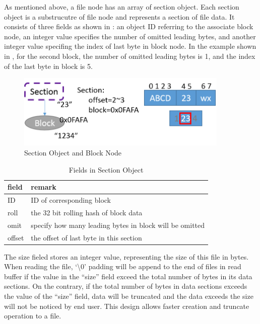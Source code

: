     As mentioned above, a file node has an array of section object. Each section object is a substrucutre of file node and represents a section of file data. It consists of three fields as shown in : an object ID referring to the associate block node, an integer value specifies the number of omitted leading bytes, and another integer value specifing the index of last byte in block node. In the example shown in , for the second block, the number of omitted leading bytes is 1, and the index of the last byte in block is 5.

\begin{figure}[hbtp]
\centering
\includegraphics[width=0.9\textwidth]{Chapter-3/figs/fig9.png}
\caption{Section Object and Block Node}
\label{fig:section_and_block}
\end{figure}

\begin{table}
\caption{Fields in Section Object}
\label{tab:section_fields}
\begin{center}
\begin{tabular}{ll}
\toprule
field & remark\\
\midrule
ID & ID of corresponding block\\
roll & the 32 bit rolling hash of block data\\
omit & specify how many leading bytes in block will be omitted\\
offset & the offset of last byte in this section\\
\bottomrule
\end{tabular}
\end{center}
\end{table}

    The size fieled stores an integer value, representing the size of this file in bytes. When reading the file, `\textbackslash0' padding will be append to the end of files in read buffer if the value in the ``size'' field exceed the total number of bytes in its data sections. On the contrary, if the total number of bytes in data sections exceeds the value of the ``size'' field, data will be truncated and the data exceeds the size will not be noticed by end user. This design allows faster creation and truncate operation to a file.

